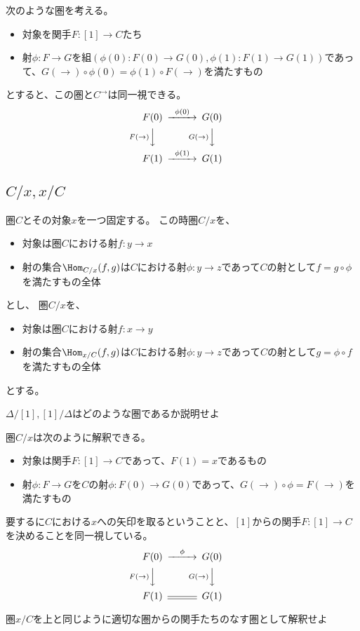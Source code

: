 \documentclass[uplatex]{jsarticle}
\begin{document}
次のような圏を考える。
\begin{itemize}
\item 対象を関手$F:[1]\to C$たち
\item 射$\phi:F\to G$を組$(\phi(0):F(0)\to G(0), \phi(1):F(1)\to G(1))$であって、$G(\to)\circ\phi(0)=\phi(1)\circ F(\to)$を満たすもの
\end{itemize}
とすると、この圏と$C^\to$は同一視できる。
\[
\begin{CD}
F(0)@>\phi(0)>>G(0)\\
@VF(\to)VV@VG(\to)VV\\
F(1)@>\phi(1)>>G(1)
\end{CD}
\]
\subsection{$C/x, x/C$}
圏$C$とその対象$x$を一つ固定する。
この時圏$C/x$を、
\begin{itemize}
\item 対象は圏$C$における射$f:y\to x$
\item 射の集合$\Hom_{C/x}(f,g)$は$C$における射$\phi:y\to z$であって$C$の射として$f=g\circ\phi$を満たすもの全体
\end{itemize}

とし、
圏$C/x$を、
\begin{itemize}
\item 対象は圏$C$における射$f:x\to y$
\item 射の集合$\Hom_{x/C}(f,g)$は$C$における射$\phi:y\to z$であって$C$の射として$g=\phi\circ f$を満たすもの全体
\end{itemize}
とする。

\begin{prob}
$\Delta/[1], [1]/\Delta$はどのような圏であるか説明せよ
\end{prob}

圏$C/x$は次のように解釈できる。
\begin{itemize}
\item 対象は関手$F:[1]\to C$であって、$F(1)=x$であるもの
\item 射$\phi:F\to G$を$C$の射$\phi:F(0)\to G(0)$であって、$G(\to)\circ\phi=F(\to)$を満たすもの
\end{itemize}
要するに$C$における$x$への矢印を取るということと、$[1]$からの関手$F:[1]\to C$を決めることを同一視している。
\[
\begin{CD}
F(0)@>\phi>>G(0)\\
@VF(\to)VV@VG(\to)VV\\
F(1)@=G(1)
\end{CD}
\]
\begin{prob}
圏$x/C$を上と同じように適切な圏からの関手たちのなす圏として解釈せよ
\end{prob}
\end{document}

